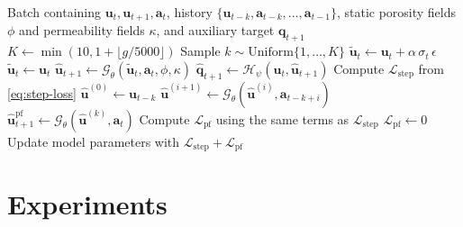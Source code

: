 \documentclass[pdflatex,sn-mathphys-ay]{sn-jnl}
\newcommand{\svec}{\mathbf{u}}            %
\newcommand{\action}{\mathbf{a}}           %
\newcommand{\model}{\mathcal{G}_\theta}    %
\begin{document}
\begin{algorithm}[t]
  \caption{One training step with adaptive noise and pushforward loss}
  \label{alg:training}
  \begin{algorithmic}[1]
    \Require Batch containing \(\svec_t,\svec_{t+1},\action_t\), history
             \(\{\svec_{t-k},\action_{t-k},\ldots,\action_{t-1}\}\), static porosity fields \(\phi\)
             and permeability fields \(\kappa\),
             and auxiliary target
             \(\mathbf{q}_{t+1}\)
    \State \(K \gets \min(10,1+\lfloor g/5000 \rfloor)\)
    \State Sample \(k \sim \mathrm{Uniform}\{1,\ldots,K\}\)
      \State \(\tilde{\svec}_t \gets \svec_t + \alpha\,\sigma_t\,\epsilon\)
    \Else
      \State \(\tilde{\svec}_t \gets \svec_t\)
    \EndIf
    \State \(\hat{\svec}_{t+1} \gets \model(\tilde{\svec}_t,\action_t, \phi, \kappa)\)
    \State \(\widehat{\mathbf{q}}_{t+1}\gets \mathcal{H}_\psi(\svec_t,\hat{\svec}_{t+1})\)
    \State Compute \(\mathcal{L}_{\mathrm{step}}\) from \cref{eq:step-loss}
      \State \(\hat{\svec}^{(0)}\gets\svec_{t-k}\)
        \State \(\hat{\svec}^{(i+1)}
          \gets \model(\hat{\svec}^{(i)},\action_{t-k+i})\) 
      \EndFor
      \State \(\hat{\svec}_{t+1}^{\mathrm{pf}}
        \gets \model(\hat{\svec}^{(k)},\action_t)\)
      \State Compute \(\mathcal{L}_{\mathrm{pf}}\) using the same terms as
             \(\mathcal{L}_{\mathrm{step}}\)
    \Else
      \State \(\mathcal{L}_{\mathrm{pf}}\gets 0\)
    \EndIf
    \State Update model parameters with
           \(\mathcal{L}_{\mathrm{step}}+\mathcal{L}_{\mathrm{pf}}\)
  \end{algorithmic}
\end{algorithm}

\section{Experiments}
\label{sec:experiments}
\end{document}

